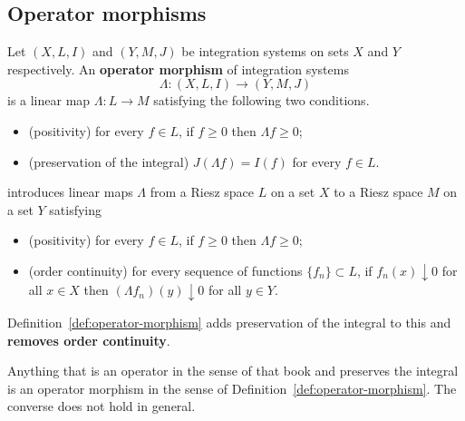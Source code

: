 \subsection{Operator morphisms}

\begin{definition}\label{def:operator-morphism}
  Let $(X,L,I)$ and $(Y,M,J)$ be integration systems on sets $X$ and
  $Y$ respectively.
  An \textbf{operator morphism} of integration systems
  \[
    \Lambda:(X,L,I)\to(Y,M,J)
  \]
  is a linear map $\Lambda:L\to M$ satisfying the following two conditions.
  \begin{itemize}
    \item (positivity) for every $f\in L$, if $f\ge0$ then $\Lambda f\ge0$;
    \item (preservation of the integral) $J(\Lambda f)=I(f)$ for every $f\in L$.
  \end{itemize}
\end{definition}

\begin{remark}\label{rem:yamagami-operator}
  \cite{Yamagami} introduces linear maps $\Lambda$ from a Riesz space $L$ on a
  set $X$ to a Riesz space $M$ on a set $Y$ satisfying
  \begin{itemize}
    \item (positivity) for every $f\in L$, if $f\ge0$ then $\Lambda f\ge0$;
    \item (order continuity) for every sequence of functions
      $\{f_n\}\subset L$, if $f_n(x)\downarrow0$ for all $x\in X$ then
      $(\Lambda f_n)(y)\downarrow0$ for all $y\in Y$.
  \end{itemize}
  Definition~\ref{def:operator-morphism} adds preservation of the integral to
  this and \textbf{removes order continuity}.

  Anything that is an operator in the sense of that book and preserves the
  integral is an operator morphism in the sense of
  Definition~\ref{def:operator-morphism}. The converse does not hold in general.
\end{remark}

